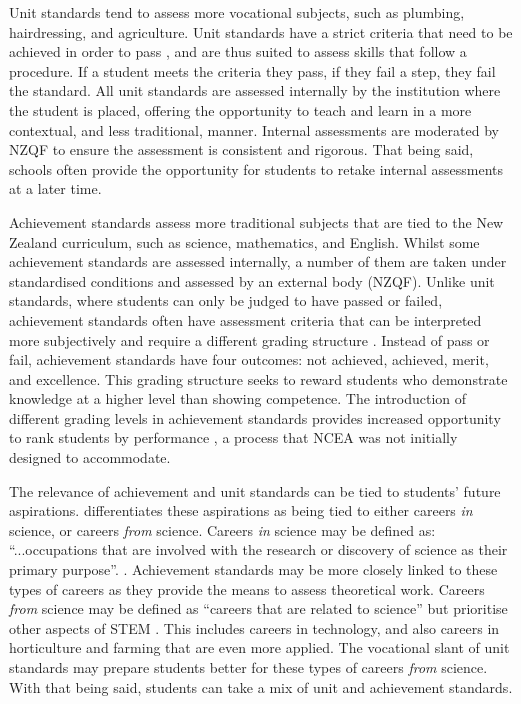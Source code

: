Unit standards tend to assess more vocational subjects, such as plumbing, hairdressing, and agriculture. Unit standards have a strict criteria that need to be achieved in order to pass \citep{hipkins2016ncea}, and are thus suited to assess skills that follow a procedure. If a student meets the criteria they pass, if they fail a step, they fail the standard. All unit standards are assessed internally by the institution where the student is placed, offering the opportunity to teach and learn in a more contextual, and less traditional, manner. Internal assessments are moderated by NZQF to ensure the assessment is consistent and rigorous. That being said, schools often provide the opportunity for students to retake internal assessments at a later time.

Achievement standards assess more traditional subjects that are tied to the New Zealand curriculum, such as science, mathematics, and English. Whilst some achievement standards are assessed internally, a number of them are taken under standardised conditions and assessed by an external body (NZQF). Unlike unit standards, where students can only be judged to have passed or failed, achievement standards often have assessment criteria that can be interpreted more subjectively and require a different grading structure \citep{hipkins2016ncea}. Instead of pass or fail, achievement standards have four outcomes: not achieved, achieved, merit, and excellence. This grading structure seeks to reward students who demonstrate knowledge at a higher level than showing competence. The introduction of different grading levels in achievement standards provides increased opportunity to rank students by performance \cite{shulruf2010new}, a process that NCEA was not initially designed to accommodate.

The relevance of achievement and unit standards can be tied to students' future aspirations. \citet[p.20]{wong2016science} differentiates these aspirations as being tied to either careers \textit{in} science, or careers \textit{from} science. Careers \textit{in} science may be defined as: ``...occupations that are involved with the research or discovery of science as their primary purpose''.  \citep[p.20]{wong2016science}. Achievement standards may be more closely linked to these types of careers as they provide the means to assess theoretical work. Careers \textit{from} science may be defined as ``careers that are related to science'' but prioritise other aspects of STEM  \cite[p.20]{wong2016science}. This includes careers in technology, and also careers in horticulture and farming that are even more applied. The vocational slant of unit standards may prepare students better for these types of careers \textit{from} science. With that being said, students can take a mix of unit and achievement standards.

